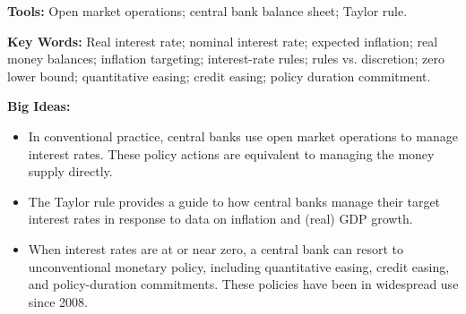 \textbf{Tools:} Open market operations; central bank balance sheet; Taylor rule.

\textbf{Key Words:} Real interest rate; nominal interest rate; expected inflation; real money balances; inflation targeting; interest-rate rules; rules vs. discretion; zero lower bound; quantitative easing; credit easing; policy duration commitment.

\textbf{Big Ideas:}
\begin{itemize}
    \item In conventional practice, central banks use open market operations to manage interest rates. These policy actions are equivalent to managing the money supply directly.
    \item The Taylor rule provides a guide to how central banks manage their target interest rates in response to data on inflation and (real) GDP growth.
    \item When interest rates are at or near zero, a central bank can resort to unconventional monetary policy, including quantitative easing, credit easing, and policy-duration commitments. These policies have been in widespread use since 2008.
\end{itemize}
